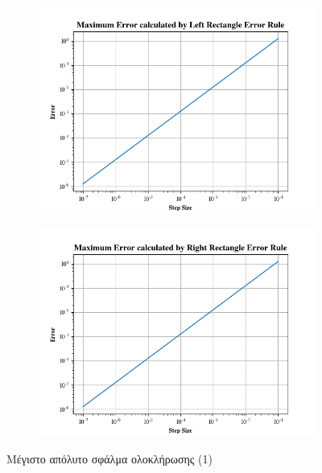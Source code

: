 \documentclass{article}
\begin{document}
\begin{figure}[H]

    \centering	
	\begin{adjustbox}{center}
        \begin{subfigure}[c]{.8\textwidth}
			\includegraphics[width=1\textwidth,height=\textheight,keepaspectratio]{media/1/Figure_2.png}
		\end{subfigure}

		\begin{subfigure}[c]{.8\textwidth}    
			\includegraphics[width=1\textwidth,height=\textheight,keepaspectratio]{media/1/Figure_4.png}
		\end{subfigure}%
	\end{adjustbox}
	\caption{Μέγιστο απόλυτο σφάλμα ολοκλήρωσης (1)}
	\label{(Errors 1)}
\end{figure}
\end{document}

